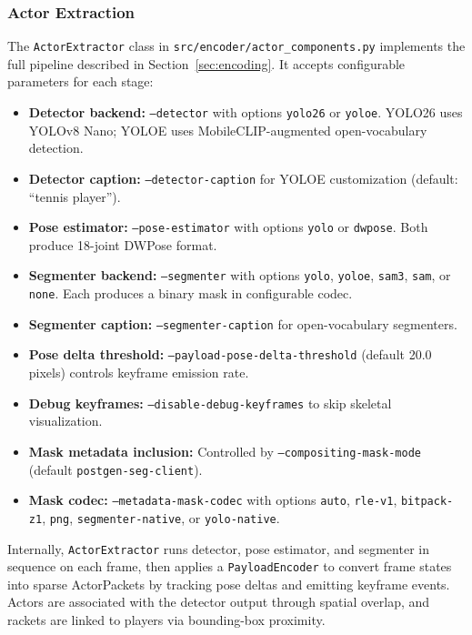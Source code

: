 \documentclass[manuscript, screen]{acmart}
\begin{document}
\subsubsection{Actor Extraction}
The \texttt{ActorExtractor} class in \texttt{src/encoder/actor\_components.py} implements the full pipeline described in Section~\ref{sec:encoding}. It accepts configurable parameters for each stage:
\begin{itemize}[topsep=0pt,itemsep=0pt,leftmargin=*]
    \item \textbf{Detector backend:} \texttt{--detector} with options \texttt{yolo26} or \texttt{yoloe}. YOLO26 uses YOLOv8 Nano; YOLOE uses MobileCLIP-augmented open-vocabulary detection.
    \item \textbf{Detector caption:} \texttt{--detector-caption} for YOLOE customization (default: ``tennis player'').
    \item \textbf{Pose estimator:} \texttt{--pose-estimator} with options \texttt{yolo} or \texttt{dwpose}. Both produce 18-joint DWPose format.
    \item \textbf{Segmenter backend:} \texttt{--segmenter} with options \texttt{yolo}, \texttt{yoloe}, \texttt{sam3}, \texttt{sam}, or \texttt{none}. Each produces a binary mask in configurable codec.
    \item \textbf{Segmenter caption:} \texttt{--segmenter-caption} for open-vocabulary segmenters.
    \item \textbf{Pose delta threshold:} \texttt{--payload-pose-delta-threshold} (default 20.0 pixels) controls keyframe emission rate.
    \item \textbf{Debug keyframes:} \texttt{--disable-debug-keyframes} to skip skeletal visualization.
    \item \textbf{Mask metadata inclusion:} Controlled by \texttt{--compositing-mask-mode} (default \texttt{postgen-seg-client}).
    \item \textbf{Mask codec:} \texttt{--metadata-mask-codec} with options \texttt{auto}, \texttt{rle-v1}, \texttt{bitpack-z1}, \texttt{png}, \texttt{segmenter-native}, or \texttt{yolo-native}.
\end{itemize}
Internally, \texttt{ActorExtractor} runs detector, pose estimator, and segmenter in sequence on each frame, then applies a \texttt{PayloadEncoder} to convert frame states into sparse ActorPackets by tracking pose deltas and emitting keyframe events. Actors are associated with the detector output through spatial overlap, and rackets are linked to players via bounding-box proximity.
\end{document}

